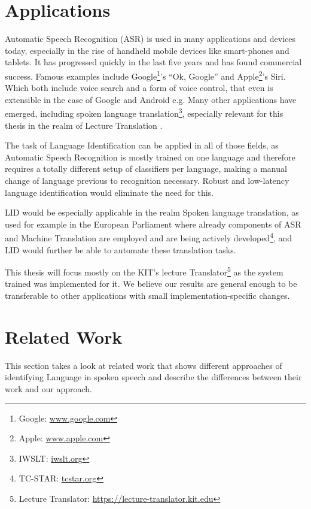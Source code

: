 \section{Applications}
\label{sec:Introduction:Apps}
Automatic Speech Recognition (ASR) is used in many applications and devices today, especially in the rise of handheld mobile devices like smart-phones and tablets. It has progressed quickly in the last five years and has found commercial success. Famous examples include Google\footnote{Google: \url{www.google.com}}'s ``Ok, Google'' and Apple\footnote{Apple: \url{www.apple.com}}'s Siri. Which both include voice search\cite{franz2008voice} and a form of voice control, that even is extensible in the case of Google and Android e.g\cite{voicecontrol2014}. Many other applications have emerged, including spoken language translation\footnote{IWSLT: \url{iwslt.org}}, especially relevant for this thesis in the realm of Lecture Translation\cite{lecturetranslator2016} .

The task of Language Identification can be applied in all of those fields, as Automatic Speech Recognition is mostly trained on one language and therefore requires a totally different setup of classifiers per language, making a manual change of language previous to recognition necessary. Robust and low-latency language identification would eliminate the need for this.

LID would be especially applicable in the realm Spoken language translation, as used for example in the European Parliament where already components of ASR and Machine Translation are employed and are being actively developed\footnote{TC-STAR: \url{tcstar.org}}\cite{vilar2005statistical}, and LID would further be able to automate these translation tasks.

This thesis will focus mostly on the KIT's lecture Translator\footnote{Lecture Translator: \url{https://lecture-translator.kit.edu}}  as the system trained was implemented for it. We believe our results are general enough to be transferable to other applications with small implementation-specific changes.

\section{Related Work}
\label{ch:Intro:Related}
This section takes a look at related work that shows different approaches of identifying Language in spoken speech and describe the differences between their work and our approach. 